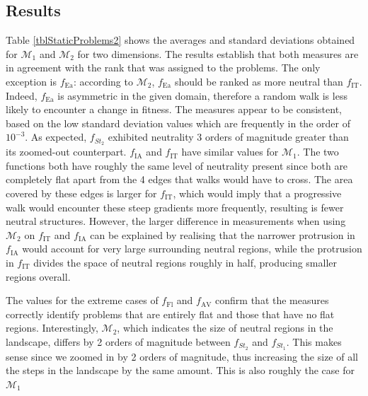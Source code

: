 \documentclass[conference]{IEEEtran}
\begin{document}
\subsection{Results}
\label{visualResults}
Table \ref{tblStaticProblems2} shows the averages and standard deviations obtained for ${\mathcal{M}_1}$ and ${\mathcal{M}_2}$ for two dimensions. The results establish that both measures are in agreement with the rank that was assigned to the problems. The only exception is $f_{\text{Ea}}$: according to ${\mathcal{M}_2}$, $f_{\text{Ea}}$ should be ranked as more neutral than $f_{\text{IT}}$. Indeed, $f_{\text{Ea}}$ is asymmetric in the given domain, therefore a random walk is less likely to encounter a change in fitness. The measures appear to be consistent, based on the low standard deviation values which are frequently in the order of $10^{-3}$. As expected, $f_{\textit{St}_2}$ exhibited neutrality 3 orders of magnitude greater than its zoomed-out counterpart. $f_{\text{IA}}$ and $f_{\text{IT}}$ have similar values for ${\mathcal{M}_1}$. The two functions both have roughly the same level of neutrality present since both are completely flat apart from the 4 edges that walks would have to cross. The area covered by these edges is larger for $f_{\text{IT}}$, which would imply that a progressive walk would encounter these steep gradients more frequently, resulting is fewer neutral structures. However, the larger difference in measurements when using ${\mathcal{M}_2}$ on $f_{\text{IT}}$ and $f_{\text{IA}}$ can be explained by realising that the narrower protrusion in $f_{\text{IA}}$ would account for very large surrounding neutral regions, while the protrusion in $f_{\text{IT}}$ divides the space of neutral regions roughly in half, producing smaller regions overall. 

The values for the extreme cases of $f_{\text{Fl}}$ and $f_{\text{AV}}$ confirm that the measures correctly identify problems that are entirely flat and those that have no flat regions. Interestingly, ${\mathcal{M}_2}$, which indicates the size of neutral regions in the landscape, differs by 2 orders of magnitude between  $f_{\textit{St}_2}$ and  $f_{\textit{St}_1}$. This makes sense since we zoomed in by 2 orders of magnitude, thus increasing the size of all the steps in the landscape by the same amount. This is also roughly the case for ${\mathcal{M}_1}$
\end{document}
